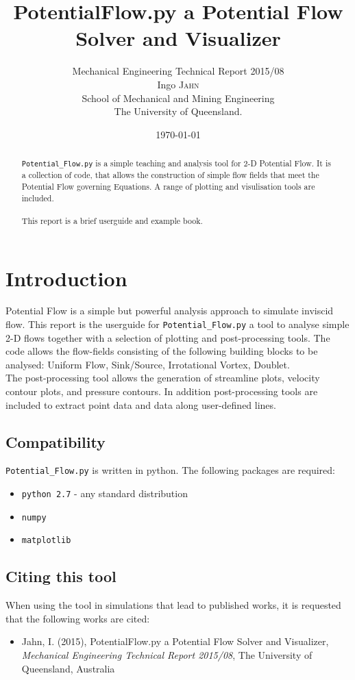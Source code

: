 \documentclass[10pt,a4paper]{article}
\title{PotentialFlow.py a Potential Flow Solver and Visualizer}
\author{Mechanical Engineering Technical Report 2015/08 \\ 
Ingo \textsc{Jahn} \\ 
School of Mechanical and Mining Engineering \\ 
The University of Queensland.}
\date{\today}
\begin{document}
\maketitle 

\begin{abstract}
\verb'Potential_Flow.py' is a simple teaching and analysis tool for 2-D Potential Flow. 
It is a collection of code, that allows the construction of simple flow fields that meet the Potential Flow governing Equations.
A range of plotting and visulisation tools are included. 
\\ \\
This report is a brief userguide and example book. 
\end{abstract}


\section{Introduction}
Potential Flow is a simple but powerful analysis approach to simulate inviscid flow. 
This report is the userguide for \verb'Potential_Flow.py' a tool to analyse simple 2-D flows together with a selection of plotting and post-processing tools.
The code allows the flow-fields consisting of the following building blocks to be analysed: 
Uniform Flow, Sink/Source, Irrotational Vortex, Doublet. \\
The post-processing tool allows the generation of streamline plots, velocity contour plots, and pressure contours.
In addition post-processing tools are included to extract point data and data along user-defined lines. 


\subsection{Compatibility}
\verb'Potential_Flow.py' is written in python. 
The following packages are required:
\begin{itemize}
\item \verb'python 2.7' - any standard distribution
\item\verb'numpy'
\item\verb'matplotlib' 
\end{itemize}

\subsection{Citing this tool}
When using the tool in simulations that lead to published works, it is requested that the following works are cited:
\begin{itemize}
\item Jahn, I. (2015), PotentialFlow.py a Potential Flow Solver and Visualizer, {\it Mechanical Engineering Technical Report 2015/08},  The University of Queensland, Australia \\
\end{itemize}
\end{document}
